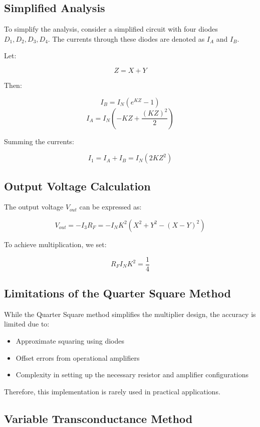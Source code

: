 \subsection{Simplified Analysis}

To simplify the analysis, consider a simplified circuit with four diodes \( D_1, D_2, D_3, D_4 \). The currents through these diodes are denoted as \( I_A \) and \( I_B \).

Let:

\[
Z = X + Y
\]

Then:

\[
I_B = I_{N} \left(e^{KZ} - 1\right)
\]
\[
I_A = I_{N} \left(-KZ + \frac{(KZ)^2}{2}\right)
\]

Summing the currents:

\[
I_1 = I_A + I_B = I_{N} \left(2KZ^2\right)
\]

\subsection{Output Voltage Calculation}

The output voltage \( V_{out} \) can be expressed as:

\[
V_{out} = -I_3 R_F = -I_{N} K^2 (X^2 + Y^2 - (X - Y)^2)
\]

To achieve multiplication, we set:

\[
R_F I_{N} K^2 = \frac{1}{4}
\]

\subsection{Limitations of the Quarter Square Method}

While the Quarter Square method simplifies the multiplier design, the accuracy is limited due to:

\begin{itemize}
    \item Approximate squaring using diodes
    \item Offset errors from operational amplifiers
    \item Complexity in setting up the necessary resistor and amplifier configurations
\end{itemize}

Therefore, this implementation is rarely used in practical applications.

\subsection{Variable Transconductance Method}

